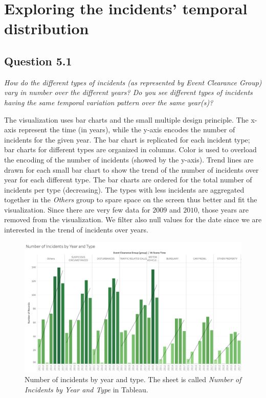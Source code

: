 \section{Exploring the incidents' temporal distribution}

\subsection*{Question 5.1}
\textit{How do the different types of incidents (as represented by Event Clearance Group) vary in number over the different years? Do you see different types of incidents having the same temporal variation pattern over the same year(s)?}

The visualization uses bar charts and the small multiple design principle.
The x-axis represent the time (in years), while the y-axis encodes the number of incidents for the given year.
The bar chart is replicated for each incident type; bar charts for different types are organized in columns.
Color is used to overload the encoding of the number of incidents (showed by the y-axis).
Trend lines are drawn for each small bar chart to show the trend of the number of incidents over year for each different type.
The bar charts are ordered for the total number of incidents per type (decreasing).
The types with less incidents are aggregated together in the \textit{Others} group to spare space on the screen thus better and fit the visualization.
Since there are very few data for $2009$ and $2010$, those years are removed from the visualization.
We filter also null values for the date since we are interested in the trend of incidents over years.

\begin{figure}[h]
	\centering
	\includegraphics[width=0.9\columnwidth]{figures/5_1_incidents_by_type_and_year}
	\caption{Number of incidents by year and type. The sheet is called \textit{Number of Incidents by Year and Type} in Tableau.}
	\label{fig:5_1_incidents_by_type_and_year}
\end{figure}

